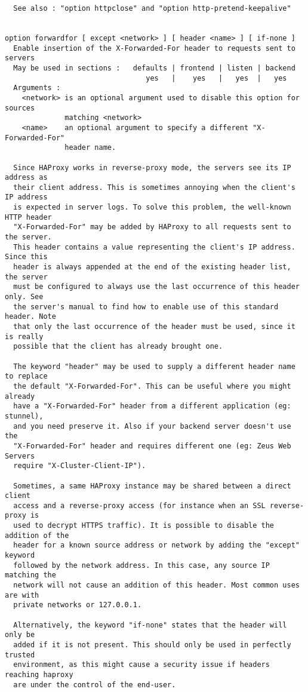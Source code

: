 \begin{verbatim}
  See also : "option httpclose" and "option http-pretend-keepalive"


option forwardfor [ except <network> ] [ header <name> ] [ if-none ]
  Enable insertion of the X-Forwarded-For header to requests sent to servers
  May be used in sections :   defaults | frontend | listen | backend
                                 yes   |    yes   |   yes  |   yes
  Arguments :
    <network> is an optional argument used to disable this option for sources
              matching <network>
    <name>    an optional argument to specify a different "X-Forwarded-For"
              header name.

  Since HAProxy works in reverse-proxy mode, the servers see its IP address as
  their client address. This is sometimes annoying when the client's IP address
  is expected in server logs. To solve this problem, the well-known HTTP header
  "X-Forwarded-For" may be added by HAProxy to all requests sent to the server.
  This header contains a value representing the client's IP address. Since this
  header is always appended at the end of the existing header list, the server
  must be configured to always use the last occurrence of this header only. See
  the server's manual to find how to enable use of this standard header. Note
  that only the last occurrence of the header must be used, since it is really
  possible that the client has already brought one.

  The keyword "header" may be used to supply a different header name to replace
  the default "X-Forwarded-For". This can be useful where you might already
  have a "X-Forwarded-For" header from a different application (eg: stunnel),
  and you need preserve it. Also if your backend server doesn't use the
  "X-Forwarded-For" header and requires different one (eg: Zeus Web Servers
  require "X-Cluster-Client-IP").

  Sometimes, a same HAProxy instance may be shared between a direct client
  access and a reverse-proxy access (for instance when an SSL reverse-proxy is
  used to decrypt HTTPS traffic). It is possible to disable the addition of the
  header for a known source address or network by adding the "except" keyword
  followed by the network address. In this case, any source IP matching the
  network will not cause an addition of this header. Most common uses are with
  private networks or 127.0.0.1.

  Alternatively, the keyword "if-none" states that the header will only be
  added if it is not present. This should only be used in perfectly trusted
  environment, as this might cause a security issue if headers reaching haproxy
  are under the control of the end-user.


\end{verbatim}
